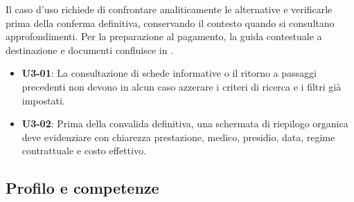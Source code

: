 Il caso d'uso richiede di confrontare analiticamente le alternative e verificarle prima della conferma definitiva, conservando il contesto quando si consultano approfondimenti. Per la preparazione al pagamento, la guida contestuale a destinazione e documenti confluisce in .
\begin{itemize}[leftmargin=*,topsep=1.5pt,itemsep=0.5pt,parsep=0pt]
\item \hypertarget{req:U3-01}{}\textbf{U3-01}: La consultazione di schede informative o il ritorno a passaggi precedenti non devono in alcun caso azzerare i criteri di ricerca e i filtri già impostati.
\item \hypertarget{req:U3-02}{}\textbf{U3-02}: Prima della convalida definitiva, una schermata di riepilogo organica deve evidenziare con chiarezza prestazione, medico, presidio, data, regime contrattuale e costo effettivo.
\end{itemize}

\clearpage
\label{doc:b:02d}

\subsection{Profilo e competenze}

